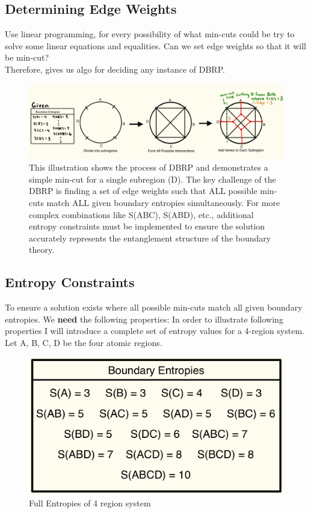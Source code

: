 \documentclass[12pt]{article}
\begin{document}
\subsection{Determining Edge Weights}
Use linear programming, for every possibility of what min-cuts could be try to solve some linear equations and equalities. Can we set edge weights so that it will be min-cut?
\\Therefore, gives us algo for deciding any instance of DBRP.

\begin{figure}[htbp]  %
    \centering
    \includegraphics[width=\textwidth]{vertex_subregions.jpeg}  %
    \caption{This illustration shows the process of DBRP and demonstrates a simple min-cut for a single subregion (D). The key challenge of the DBRP is finding a set of edge weights such that ALL possible min-cuts match ALL given boundary entropies simultaneously. For more complex combinations like S(ABC), S(ABD), etc., additional entropy constraints must be implemented to ensure the solution accurately represents the entanglement structure of the boundary theory.}  %
    \label{fig:single subregion min-cut}  %
\end{figure}

\subsection{Entropy Constraints}
To ensure a solution exists where all possible min-cuts match all given boundary entropies. We \textbf{need} the following properties:
In order to illustrate following properties I will introduce a complete set of entropy values for a 4-region system. Let A, B, C, D be the four atomic regions.

\begin{figure}[htbp]
    \centering
    \includegraphics[width=.7\textwidth, height=.22\textheight]{values.jpeg}  %
    \caption{Full Entropies of 4 region system}
\end{figure}
\end{document}
